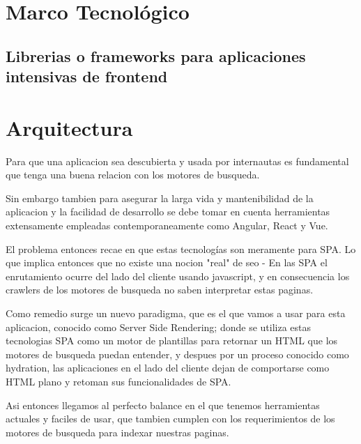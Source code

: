 \section{Marco Tecnológico}



\subsection{Librerias o frameworks para aplicaciones intensivas de frontend }

\section{Arquitectura}

Para que una aplicacion sea descubierta y usada por internautas es fundamental que tenga una buena relacion con los motores de busqueda.

Sin embargo tambien para asegurar la larga vida y mantenibilidad de la aplicacion y la facilidad de desarrollo se debe tomar en cuenta herramientas extensamente empleadas contemporaneamente como Angular, React y Vue.

El problema entonces recae en que estas tecnologías son meramente para SPA. Lo que implica entonces que no existe una nocion "real" de seo - En las SPA el enrutamiento ocurre del lado del cliente usando javascript, y en consecuencia los crawlers de los motores de busqueda no saben interpretar estas paginas.

Como remedio surge un nuevo paradigma, que es el que vamos a usar para esta aplicacion, conocido como Server Side Rendering; donde se utiliza estas tecnologias SPA como un motor de plantillas para retornar un HTML que los motores de busqueda puedan entender, y despues por un proceso conocido como hydration, las aplicaciones en el lado del cliente dejan de comportarse como HTML plano y retoman sus funcionalidades de SPA.

Asi entonces llegamos al perfecto balance en el que tenemos herramientas actuales y faciles de usar, que tambien cumplen con los requerimientos de los motores de busqueda para indexar nuestras paginas.